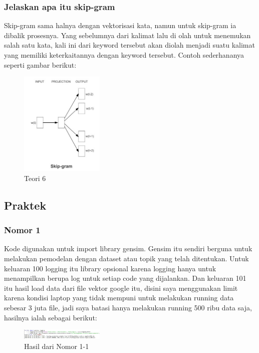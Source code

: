 \subsubsection{Jelaskan apa itu skip-gram}
\hfill\break
Skip-gram sama halnya dengan vektorisasi kata, namun untuk skip-gram ia dibalik prosesnya. Yang sebelumnya dari kalimat lalu di olah untuk menemukan salah satu kata, kali ini dari keyword tersebut akan diolah menjadi suatu kalimat yang memiliki keterkaitannya dengan keyword tersebut. Contoh sederhananya seperti gambar berikut: 
\begin{figure}[H]
\includegraphics[width=4cm]{figures/1174067/5/6.jpg}
\centering
\caption{Teori 6}
\end{figure}

\subsection{Praktek}
\subsubsection{Nomor 1}

\hfill\break

Kode digunakan untuk import library gensim. Gensim itu sendiri berguna untuk melakukan pemodelan dengan dataset atau topik yang telah ditentukan. Untuk keluaran 100 logging itu library opsional karena logging hanya untuk menampilkan berupa log untuk setiap code yang dijalankan. Dan keluaran 101 itu hasil load data dari file vektor google itu, disini saya menggunakan limit karena kondisi laptop yang tidak mempuni untuk melakukan running data sebesar 3 juta file, jadi saya batasi hanya melakukan running 500 ribu data saja, hasilnya ialah sebagai berikut: 
\begin{figure}[H]
\includegraphics[width=4cm]{figures/1174067/5/hasil1-1.jpg}
\centering
\caption{Hasil dari Nomor 1-1}
\end{figure}

